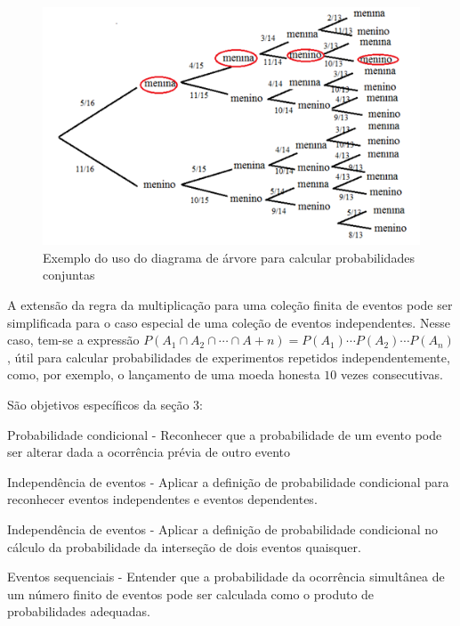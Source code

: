\begin{paginatexto}
\begin{figure}[H]
\includegraphics[width=\linewidth]{exemploarvore2.png}
\caption{Exemplo do uso do diagrama de árvore para calcular probabilidades conjuntas}
\label{exemploarvore2}
\end{figure}

A extensão da regra da multiplicação para uma coleção finita de eventos pode ser simplificada para o caso especial de uma coleção de eventos independentes. Nesse caso, tem-se a expressão $P(A_1\cap A_2\cap\cdots\cap A+n)=P(A_1)\cdots P(A_2)\cdots P(A_n)$, útil para calcular probabilidades de experimentos repetidos independentemente, como, por exemplo, o lançamento de uma moeda honesta $10$ vezes consecutivas.

São objetivos específicos da seção 3:

\begin{OES}
\item Probabilidade condicional - Reconhecer que a probabilidade de um evento pode ser alterar dada a ocorrência prévia de outro evento
\item Independência de eventos - Aplicar a definição de probabilidade condicional para reconhecer eventos independentes e eventos dependentes.
\item Independência de eventos - Aplicar a definição de probabilidade condicional no cálculo da probabilidade da interseção de dois eventos quaisquer.
\item Eventos sequenciais - Entender que a probabilidade da ocorrência simultânea de um número finito de eventos pode ser calculada como o produto de probabilidades adequadas.
\end{OES}
\end{paginatexto}


